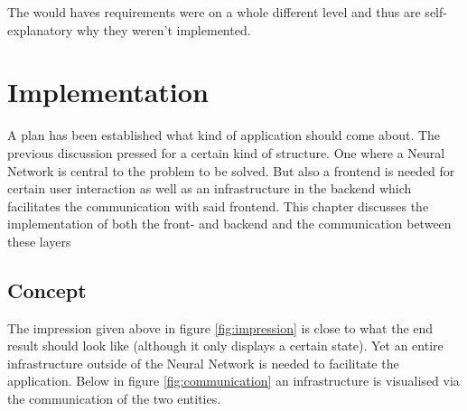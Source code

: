 \documentclass[a4paper,onecolumn]{report}
\begin{document}
The would haves requirements were on a whole different level and thus are self-explanatory why they weren't implemented.



\chapter{Implementation}
A plan has been established what kind of application should come about. The previous discussion pressed for a certain kind of structure. One where a Neural Network is central to the problem to be solved. But also a frontend is needed for certain user interaction as well as an infrastructure in the backend which facilitates the communication with said frontend. This chapter discusses the implementation of both the front- and backend and the communication between these layers

\section{Concept}
The impression given above in figure \ref{fig:impression} is close to what the end result should look like (although it only displays a certain state). Yet an entire infrastructure outside of the Neural Network is needed to facilitate the application. Below in figure \ref{fig:communication} an infrastructure is visualised via the communication of the two entities.
\end{document}
